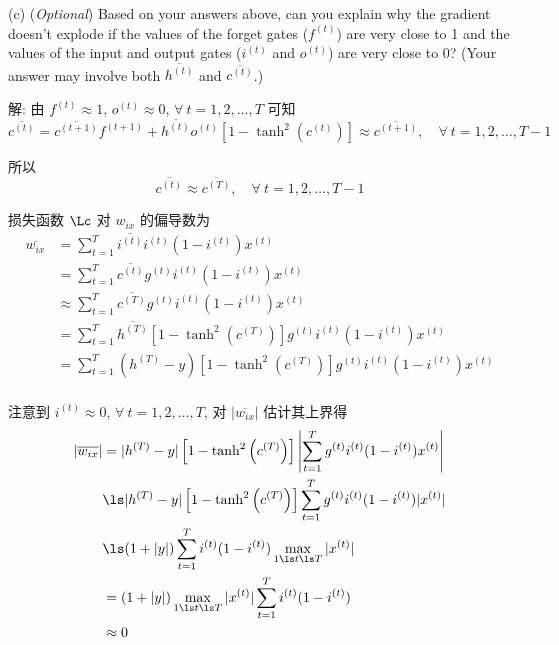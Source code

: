 \documentclass[openany]{ctexbook}
\theoremstyle{kaiti}
\theoremstyle{normal}
\begin{document}
(c) (\emph{Optional}) Based on your answers above, can you explain why the gradient doesn't explode if the values of the forget gates ($f^{(t)}$) are very close to 1 and the values of the input and output gates ($i^{(t)}$ and $o^{(t)}$) are very close to 0? (Your answer may involve both $\overline{h^{(t)}}$ and $\overline{c^{(t)}}$.)

解: 由 $f^{(t)}\approx1$, $o^{(t)}\approx0$, $\forall~t=1,2,\dots,T$ 可知
\begin{equation}
  \overline{c^{(t)}}
  =\overline{c^{(t+1)}}f^{(t+1)}
   +\overline{h^{(t)}}o^{(t)}\left[1-\tanh^2\left(c^{(t)}\right)\right]
  \approx\overline{c^{(t+1)}},\quad\forall~t=1,2,\dots,T-1
\end{equation}

所以
\begin{equation}
  \overline{c^{(t)}}\approx\overline{c^{(T)}},\quad\forall~t=1,2,\dots,T-1
\end{equation}

损失函数 $\Lc$ 对 $w_{ix}$ 的偏导数为
\begin{equation}
  \begin{aligned}
    \overline{w_{ix}}
    &=\sum_{t=1}^T\overline{i^{(t)}}i^{(t)}(1-i^{(t)})x^{(t)}\\
    &=\sum_{t=1}^T\overline{c^{(t)}}g^{(t)}i^{(t)}(1-i^{(t)})x^{(t)}\\
    &\approx\sum_{t=1}^T\overline{c^{(T)}}g^{(t)}i^{(t)}(1-i^{(t)})x^{(t)}\\
    &=\sum_{t=1}^T\overline{h^{(T)}}\left[1-\tanh^2\left(c^{(T)}\right)\right]g^{(t)}i^{(t)}(1-i^{(t)})x^{(t)}\\
    &=\sum_{t=1}^T(h^{(T)}-y)\left[1-\tanh^2\left(c^{(T)}\right)\right]g^{(t)}i^{(t)}(1-i^{(t)})x^{(t)}\\
  \end{aligned}
\end{equation}

注意到 $i^{(t)}\approx0$, $\forall~t=1,2,\dots,T$, 对 $|\overline{w_{ix}}|$ 估计其上界得
\begin{equation}
  \begin{aligned}
    |\overline{w_{ix}}|
    &=|h^{(T)}-y|\left[1-\tanh^2\left(c^{(T)}\right)\right]\left|\sum_{t=1}^Tg^{(t)}i^{(t)}(1-i^{(t)})x^{(t)}\right|\\
    &\ls|h^{(T)}-y|\left[1-\tanh^2\left(c^{(T)}\right)\right]\sum_{t=1}^Tg^{(t)}i^{(t)}(1-i^{(t)})|x^{(t)}|\\
    &\ls(1+|y|)\sum_{t=1}^Ti^{(t)}(1-i^{(t)})\max_{1\ls t\ls T}|x^{(t)}|\\
    &=(1+|y|)\max_{1\ls t\ls T}|x^{(t)}|\sum_{t=1}^Ti^{(t)}(1-i^{(t)})\\
    &\approx0
  \end{aligned}
\end{equation}
\end{document}
